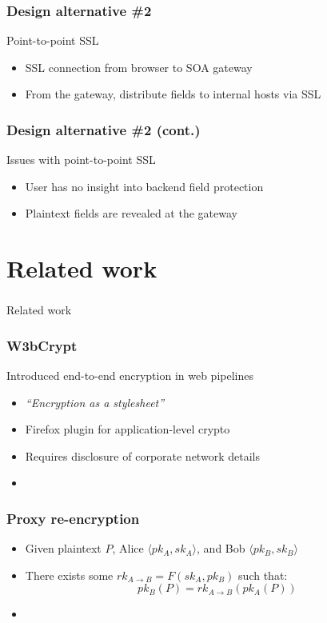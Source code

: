 \documentclass{beamer}
\begin{document}
\begin{frame}
\frametitle{Design alternative \#2}
Point-to-point SSL
\smallskip
\begin{itemize}
\item SSL connection from browser to SOA gateway
\item From the gateway, distribute fields to internal hosts via SSL
\end{itemize}
\end{frame}

\begin{frame}
\frametitle{Design alternative \#2 (cont.)}
Issues with point-to-point SSL
\smallskip
\begin{itemize}
\item User has no insight into backend field protection 
\item Plaintext fields are revealed at the gateway
\end{itemize}
\end{frame}

\section{Related work}
\begin{frame}
\frametitle{}
\begin{center}
\Large{Related work}
\end{center}
\end{frame}

\begin{frame}
\frametitle{W3bCrypt}
Introduced end-to-end encryption in web pipelines
\smallskip
\begin{itemize}
\item \emph{``Encryption as a stylesheet''}
\item Firefox plugin for application-level crypto
\item Requires disclosure of corporate network details
\item \cite{w3bcrypt} 
\end{itemize}
\end{frame}

\begin{frame}
\frametitle{Proxy re-encryption}
\begin{itemize}
\item Given plaintext $P$, Alice $\langle pk_A, sk_A \rangle$, and Bob
$\langle pk_B, sk_B \rangle$
\item There exists some $rk_{A \to B} = F(sk_A, pk_B)$ such that:
\begin{equation*}
pk_B(P) = rk_{A \to B}( pk_A (P))
\end{equation*}
\item \cite{atomic_proxy_reencryption} 
\end{itemize}
\end{frame}
\end{document}
